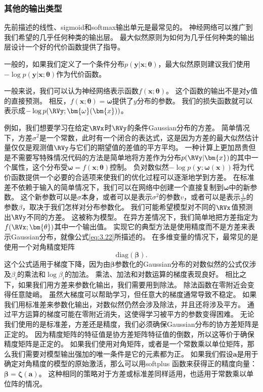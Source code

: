 
\subsubsection{其他的输出类型}
\label{sec:other_output_types}

先前描述的线性、sigmoid和softmax输出单元是最常见的。
神经网络可以推广到我们希望的几乎任何种类的输出层。
最大似然原则为如何为几乎任何种类的输出层设计一个好的代价函数提供了指导。

一般的，如果我们定义了一个条件分布$p(\bm{y}|\bm{x}; \bm{\theta})$，最大似然原则建议我们使用$-\log p(\bm{y}| \bm{x};\bm{\theta})$作为代价函数。

一般来说，我们可以认为神经网络表示函数$f(\bm{x};\bm{\theta})$。
这个函数的输出不是对$\bm{y}$值的直接预测。
相反，$f(\bm{x};\bm{\theta})=\bm{\omega}$提供了$y$分布的参数。
我们的损失函数就可以表示成$-\log p(\RVy; \bm{\omega}(\bm{x}))$。

例如，我们想要学习在给定$\RVx$时$\RVy$的条件Gaussian分布的方差。
简单情况下，方差$\sigma^2$是一个常数，此时有一个闭合的表达式，这是因为方差的最大似然估计量仅仅是观测值$\RVy$与它们的期望值的差值的平方平均。
一种计算上更加昂贵但是不需要写特殊情况代码的方法是简单地将方差作为分布$p(\RVy|\bm{x})$的其中一个属性，这个分布受$\bm{\omega}=f(\bm{x};\bm{\theta})$控制。
负对数似然$-\log p(\bm{y};\bm{\omega}(\bm{x}))$将为代价函数提供一个必要的合适项来使我们的优化过程可以逐渐地学到方差。
在标准差不依赖于输入的简单情况下，我们可以在网络中创建一个直接复制到$\bm{\omega}$中的新参数。
这个新参数可以是$\sigma$本身，或者可以是表示$\sigma^2$的参数$v$，或者可以是表示$\frac{1}{\sigma^2}$的参数$\beta$，取决于我们怎样对分布参数化。
我们可能希望模型对不同的$\RVx$值预测出$\RVy$不同的方差。
这被称为模型。
在异方差情况下，我们简单地把方差指定为$f(\RVx;\bm{\theta})$其中一个输出值。
实现它的典型方法是使用精度而不是方差来表示Gaussian分布，就像公式\ref{eq:3.22}所描述的。
在多维变量的情况下，最常见的是使用一个对角精度矩阵
\begin{equation}
\text{diag}(\bm{\beta}).
\end{equation}
这个公式适用于梯度下降，因为由$\bm{\beta}$参数化的Gaussian分布的对数似然的公式仅涉及$\beta_i$的乘法和$\log \beta_i$的加法。
乘法、加法和对数运算的梯度表现良好。
相比之下，如果我们用方差来参数化输出，我们需要用到除法。
除法函数在零附近会变得任意陡峭。
虽然大梯度可以帮助学习，但任意大的梯度通常导致不稳定。
如果我们用标准差来参数化输出，对数似然仍然会涉及除法，并且还将涉及平方。
通过平方运算的梯度可能在零附近消失，这使得学习被平方的参数变得困难。
无论我们使用的是标准差，方差还是精度，我们必须确保Gaussian分布的协方差矩阵是正定的。
因为精度矩阵的特征值是协方差矩阵特征值的倒数，所以这等价于确保精度矩阵是正定的。
如果我们使用对角矩阵，或者是一个常数乘以单位矩阵，那么我们需要对模型输出强加的唯一条件是它的元素都为正。
如果我们假设$\bm{a}$是用于确定对角精度的模型的原始激活，那么可以用softplus 函数来获得正的精度向量：$\bm{\beta}=\bm{\zeta}(\bm{a})$。
这种相同的策略对于方差或标准差同样适用，也适用于常数乘以单位阵的情况。

